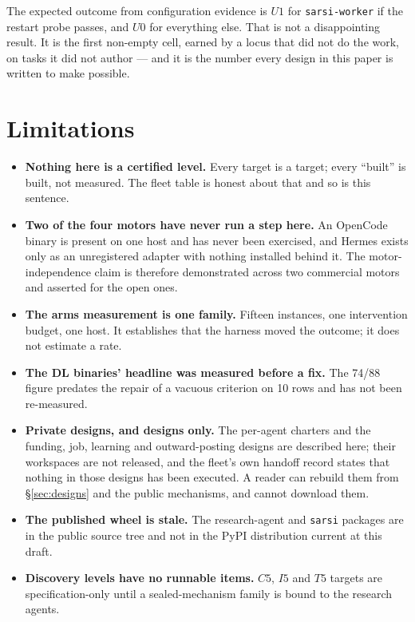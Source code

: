 \documentclass[11pt]{article}
\theoremstyle{definition}
\begin{document}
The expected outcome from configuration evidence is $U1$ for \texttt{sarsi-worker} if the restart probe passes, and $U0$ for everything else. That is not a disappointing result. It is the first non-empty cell, earned by a locus that did not do the work, on tasks it did not author --- and it is the number every design in this paper is written to make possible.

\section{Limitations}\label{sec:limits}

\begin{itemize}[leftmargin=*]
\item \textbf{Nothing here is a certified level.} Every target is a target; every ``built'' is built, not measured. The fleet table is honest about that and so is this sentence.
\item \textbf{Two of the four motors have never run a step here.} An OpenCode binary is present on one host and has never been exercised, and Hermes exists only as an unregistered adapter with nothing installed behind it. The motor-independence claim is therefore demonstrated across two commercial motors and asserted for the open ones.
\item \textbf{The arms measurement is one family.} Fifteen instances, one intervention budget, one host. It establishes that the harness moved the outcome; it does not estimate a rate.
\item \textbf{The DL binaries' headline was measured before a fix.} The 74/88 figure predates the repair of a vacuous criterion on 10 rows and has not been re-measured.
\item \textbf{Private designs, and designs only.} The per-agent charters and the funding, job, learning and outward-posting designs are described here; their workspaces are not released, and the fleet's own handoff record states that nothing in those designs has been executed. A reader can rebuild them from \S\ref{sec:designs} and the public mechanisms, and cannot download them.
\item \textbf{The published wheel is stale.} The research-agent and \texttt{sarsi} packages are in the public source tree and not in the PyPI distribution current at this draft.
\item \textbf{Discovery levels have no runnable items.} $C5$, $I5$ and $T5$ targets are specification-only until a sealed-mechanism family is bound to the research agents.
\end{itemize}
\end{document}
